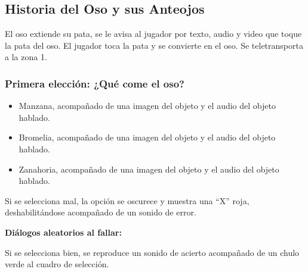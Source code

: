 \begin{play}

\subsection*{Historia del Oso y sus Anteojos}



\begin{stage}
El oso extiende su pata, se le avisa al jugador por texto, audio y video que toque la pata del oso.
El jugador toca la pata y se convierte en el oso.
Se teletransporta a la zona 1.
\end{stage}

\subsubsection*{Primera elección: ¿Qué come el oso?}


\begin{itemize}
  \item Manzana, acompañado de una imagen del objeto y el audio del objeto hablado.
  \item Bromelia, acompañado de una imagen del objeto y el audio del objeto hablado.
  \item Zanahoria, acompañado de una imagen del objeto y el audio del objeto hablado.
\end{itemize}

\begin{stage}
Si se selecciona mal, la opción se oscurece y muestra una ``X'' roja, deshabilitándose acompañado de un sonido de error.
\end{stage}

\textbf{Diálogos aleatorios al fallar:}


\begin{stage}
Si se selecciona bien, se reproduce un sonido de acierto acompañado de un chulo verde al cuadro de selección.
\end{stage}


\end{play}
